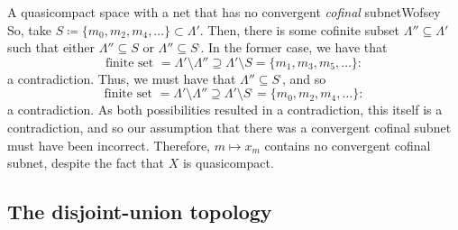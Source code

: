 \begin{exm}{A quasicompact space with a net that has no convergent \emph{cofinal} subnet}{Wofsey}
So, take $S\coloneqq \{ m_0,m_2,m_4,\ldots \} \subset \Lambda '$.  Then, there is some cofinite subset $\Lambda ''\subseteq \Lambda '$ such that either $\Lambda ''\subseteq S$ or $\Lambda ''\subseteq S^{\comp}$.  In the former case, we have that
\begin{equation}
\text{finite set }=\Lambda '\setminus \Lambda '' \supseteq \Lambda '\setminus S=\{ m_1,m_3,m_5,\ldots \} :
\end{equation}
a contradiction.  Thus, we must have that $\Lambda ''\subseteq S^{\comp}$, and so
\begin{equation}
\text{finite set }=\Lambda '\setminus \Lambda ''\supseteq \Lambda '\setminus S^{\comp}=\{ m_0,m_2,m_4,\ldots \} :
\end{equation}
a contradiction.  As both possibilities resulted in a contradiction, this itself is a contradiction, and so our assumption that there was a convergent cofinal subnet must have been incorrect.  Therefore, $m\mapsto x_m$ contains no convergent cofinal subnet, despite the fact that $X$ is quasicompact.
\end{exm}

\subsection{The disjoint-union topology}


